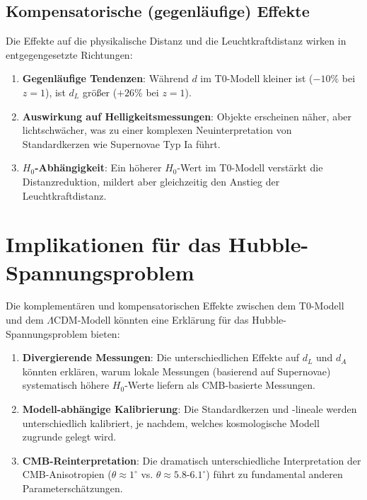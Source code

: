 \documentclass[a4paper,12pt]{article}
\theoremstyle{definition}
\theoremstyle{remark}
\begin{document}
	\subsection{Kompensatorische (gegenläufige) Effekte}
	
	Die Effekte auf die physikalische Distanz und die Leuchtkraftdistanz wirken in entgegengesetzte Richtungen:
	
	\begin{enumerate}
		\item \textbf{Gegenläufige Tendenzen}: Während $d$ im T0-Modell kleiner ist ($-10\%$ bei $z = 1$), ist $d_L$ größer ($+26\%$ bei $z = 1$).
		
		\item \textbf{Auswirkung auf Helligkeitsmessungen}: Objekte erscheinen näher, aber lichtschwächer, was zu einer komplexen Neuinterpretation von Standardkerzen wie Supernovae Typ Ia führt.
		
		\item \textbf{$H_0$-Abhängigkeit}: Ein höherer $H_0$-Wert im T0-Modell verstärkt die Distanzreduktion, mildert aber gleichzeitig den Anstieg der Leuchtkraftdistanz.
	\end{enumerate}
	
	\section{Implikationen für das Hubble-Spannungsproblem}
	
	Die komplementären und kompensatorischen Effekte zwischen dem T0-Modell und dem $\Lambda$CDM-Modell könnten eine Erklärung für das Hubble-Spannungsproblem bieten:
	
	\begin{enumerate}
		\item \textbf{Divergierende Messungen}: Die unterschiedlichen Effekte auf $d_L$ und $d_A$ könnten erklären, warum lokale Messungen (basierend auf Supernovae) systematisch höhere $H_0$-Werte liefern als CMB-basierte Messungen.
		
		\item \textbf{Modell-abhängige Kalibrierung}: Die Standardkerzen und -lineale werden unterschiedlich kalibriert, je nachdem, welches kosmologische Modell zugrunde gelegt wird.
		
		\item \textbf{CMB-Reinterpretation}: Die dramatisch unterschiedliche Interpretation der CMB-Anisotropien ($\theta \approx 1^\circ$ vs. $\theta \approx 5.8$-$6.1^\circ$) führt zu fundamental anderen Parameterschätzungen.
	\end{enumerate}
	
\end{document}

